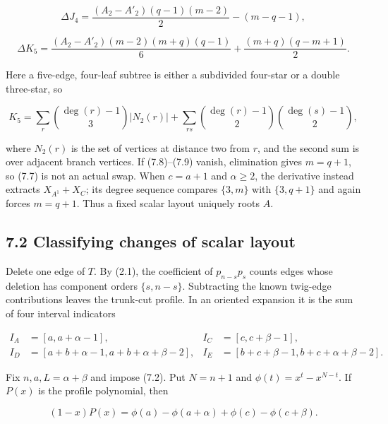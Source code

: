 \documentclass[11pt]{article}
\begin{document}
\begin{equation*}
\Delta J_4=
\frac{(A_2-A'_2)(q-1)(m-2)}2-(m-q-1),
\tag{7.8}
\end{equation*}


\begin{equation*}
\Delta K_5=
\frac{(A_2-A'_2)(m-2)(m+q)(q-1)}6
+\frac{(m+q)(q-m+1)}2.
\tag{7.9}
\end{equation*}


Here a five-edge, four-leaf subtree is either a subdivided four-star or a double three-star, so

\begin{equation*}
K_5=\sum_r\binom{\deg(r)-1}{3}|N_2(r)|
+\sum_{rs}\binom{\deg(r)-1}{2}\binom{\deg(s)-1}{2},
\tag{7.10}
\end{equation*}


where $N_2(r)$ is the set of vertices at distance two from $r$, and the second sum is over adjacent
branch vertices. If (7.8)--(7.9) vanish, elimination gives
$m=q+1$, so (7.7) is not an actual swap. When $c=a+1$ and $\alpha\geq2$, the derivative instead
extracts $X_{A^1}+X_C$; its degree sequence compares $\{3,m\}$ with $\{3,q+1\}$ and again forces
$m=q+1$. Thus a fixed scalar layout uniquely roots $A$.

\Needspace{0.13\textheight}
\subsection*{7.2 Classifying changes of scalar layout}


Delete one edge of $T$. By (2.1), the coefficient of $p_{n-s}p_s$ counts edges whose deletion has
component orders $\{s,n-s\}$. Subtracting the known twig-edge contributions leaves the trunk-cut
profile. In an oriented expansion it is the sum of four interval indicators

\begin{equation*}
\begin{aligned}
I_A&=[a,a+\alpha-1],&
I_C&=[c,c+\beta-1],\\
I_D&=[a+b+\alpha-1,a+b+\alpha+\beta-2],&
I_E&=[b+c+\beta-1,b+c+\alpha+\beta-2].
\end{aligned}
\tag{7.11}
\end{equation*}


Fix $n,a,L=\alpha+\beta$ and impose (7.2). Put $N=n+1$ and
$\phi(t)=x^t-x^{N-t}$. If $P(x)$ is the profile polynomial, then

\begin{equation*}
(1-x)P(x)=
\phi(a)-\phi(a+\alpha)+\phi(c)-\phi(c+\beta).
\tag{7.12}
\end{equation*}
\end{document}
